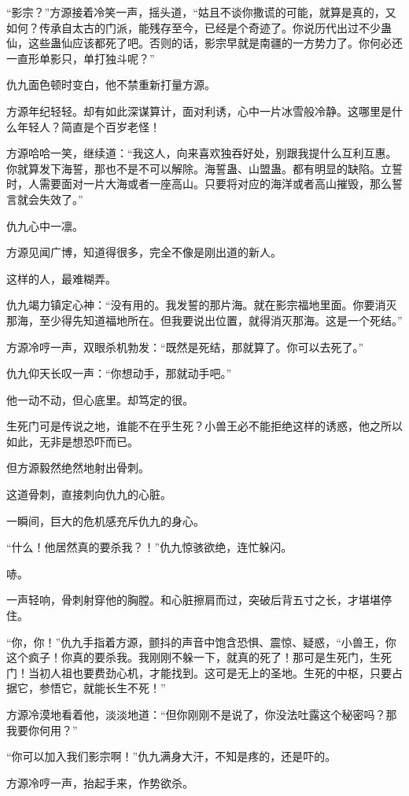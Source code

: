 \begin{this_body}
“影宗？”方源接着冷笑一声，摇头道，“姑且不谈你撒谎的可能，就算是真的，又如何？传承自太古的门派，能残存至今，已经是个奇迹了。你说历代出过不少蛊仙，这些蛊仙应该都死了吧。否则的话，影宗早就是南疆的一方势力了。你何必还一直形单影只，单打独斗呢？”

仇九面色顿时变白，他不禁重新打量方源。

方源年纪轻轻。却有如此深谋算计，面对利诱，心中一片冰雪般冷静。这哪里是什么年轻人？简直是个百岁老怪！

方源哈哈一笑，继续道：“我这人，向来喜欢独吞好处，别跟我提什么互利互惠。你就算发下海誓，那也不是不可以解除。海誓蛊、山盟蛊。都有明显的缺陷。立誓时，人需要面对一片大海或者一座高山。只要将对应的海洋或者高山摧毁，那么誓言就会失效了。”

仇九心中一凛。

方源见闻广博，知道得很多，完全不像是刚出道的新人。

这样的人，最难糊弄。

仇九竭力镇定心神：“没有用的。我发誓的那片海。就在影宗福地里面。你要消灭那海，至少得先知道福地所在。但我要说出位置，就得消灭那海。这是一个死结。”

方源冷哼一声，双眼杀机勃发：“既然是死结，那就算了。你可以去死了。”

仇九仰天长叹一声：“你想动手，那就动手吧。”

他一动不动，但心底里。却笃定的很。

生死门可是传说之地，谁能不在乎生死？小兽王必不能拒绝这样的诱惑，他之所以如此，无非是想恐吓而已。

但方源毅然绝然地射出骨刺。

这道骨刺，直接刺向仇九的心脏。

一瞬间，巨大的危机感充斥仇九的身心。

“什么！他居然真的要杀我？！”仇九惊骇欲绝，连忙躲闪。

哧。

一声轻响，骨刺射穿他的胸膛。和心脏擦肩而过，突破后背五寸之长，才堪堪停住。

“你，你！”仇九手指着方源，颤抖的声音中饱含恐惧、震惊、疑惑，“小兽王，你这个疯子！你真的要杀我。我刚刚不躲一下，就真的死了！那可是生死门，生死门！当初人祖也要费劲心机，才能找到。这可是无上的圣地。生死的中枢，只要占据它，参悟它，就能长生不死！”

方源冷漠地看着他，淡淡地道：“但你刚刚不是说了，你没法吐露这个秘密吗？那我要你何用？”

“你可以加入我们影宗啊！”仇九满身大汗，不知是疼的，还是吓的。

方源冷哼一声，抬起手来，作势欲杀。


\end{this_body}
